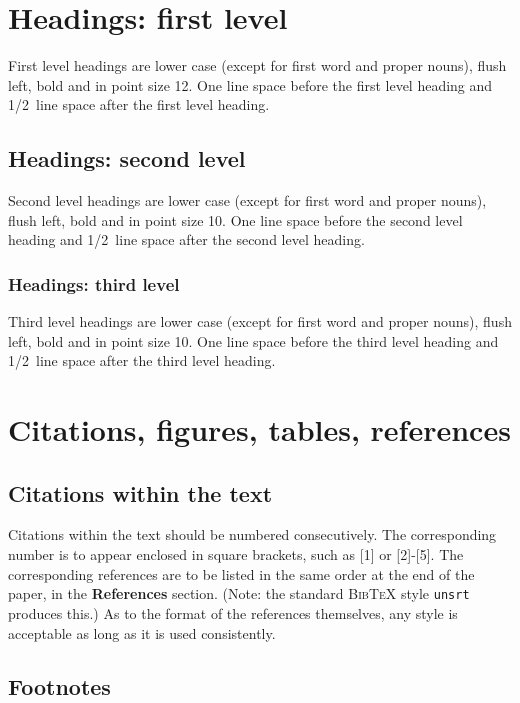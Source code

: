 \documentclass{article} %
\begin{document}
\section{Headings: first level}
\label{headings}

First level headings are lower case (except for first word and proper nouns),
flush left, bold and in point size 12. One line space before the first level
heading and 1/2~line space after the first level heading.

\subsection{Headings: second level}

Second level headings are lower case (except for first word and proper nouns),
flush left, bold and in point size 10. One line space before the second level
heading and 1/2~line space after the second level heading.

\subsubsection{Headings: third level}

Third level headings are lower case (except for first word and proper nouns),
flush left, bold and in point size 10. One line space before the third level
heading and 1/2~line space after the third level heading.

\section{Citations, figures, tables, references}
\label{others}


\subsection{Citations within the text}

Citations within the text should be numbered consecutively. The corresponding
number is to appear enclosed in square brackets, such as [1] or [2]-[5]. The
corresponding references are to be listed in the same order at the end of the
paper, in the \textbf{References} section. (Note: the standard
\textsc{Bib\TeX} style \texttt{unsrt} produces this.) As to the format of the
references themselves, any style is acceptable as long as it is used
consistently.


\subsection{Footnotes}
\end{document}
